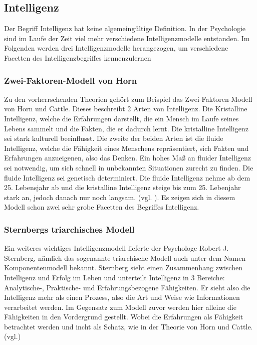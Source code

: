 \documentclass[a4paper, 11pt]{scrartcl}
\begin{document}
\subsection{Intelligenz}
Der Begriff Intelligenz hat keine algemeingültige Definition. In der Psychologie sind im Laufe der Zeit viel mehr verschiedene
Intelligenzmodelle entstanden. Im Folgenden werden drei Intelligenzmodelle herangezogen, um verschiedene Facetten des
 Intelligenzbegriffes kennenzulernen

\subsubsection{Zwei-Faktoren-Modell von Horn}
 Zu den vorherrschenden Theorien gehört zum Beispiel das Zwei-Faktoren-Modell von Horn und Cattle.
Dieses beschreibt 2 Arten von Intelligenz. Die Kristalline Intelligenz, welche die Erfahrungen darstellt, die ein Mensch
im Laufe seines Lebens sammelt und die Fakten, die er dadurch lernt. Die kristalline Intelligenz sei stark kulturell beeinflusst.
Die zweite der beiden Arten ist die fluide Intelligenz, welche
die Fähigkeit eines Menschens repräsentiert, sich Fakten und Erfahrungen anzueigenen, also das Denken. Ein hohes Maß
an fluider Intelligenz sei notwendig, um sich schnell in unbekannten Situationen zurecht zu finden. Die fluide Intelligenz sei genetisch
determiniert. Die fluide Intelligenz nehme ab dem 25. Lebensjahr ab und die kristalline Intelligenz steige bis zum 25. Lebenjahr stark an,
jedoch danach nur noch langsam. (vgl. \cite{Dorsch2019}). Es zeigen sich in diesem Modell schon zwei sehr grobe Facetten
des Begriffes Intelligenz.

\subsubsection{Sternbergs triarchisches Modell}
Ein weiteres wichtiges Intelligenzmodell lieferte
der Psychologe Robert J. Sternberg, nämlich das sogenannte triarchische Modell auch unter dem Namen Komponentenmodell
bekannt. Sternberg sieht einen Zusammenhang zwischen Intelligenz und Erfolg im Leben und unterteilt Intelligenz in 3 Bereiche:
Analytische-, Praktische- und Erfahrungsbezogene Fähigkeiten. Er sieht also die Intelligenz mehr als einen Prozess, also die Art und
Weise wie Informationen verarbeitet werden. Im Gegensatz zum Modell zuvor werden hier alleine die Fähigkeiten in den Vordergrund gestellt.
Wobei die Erfahrungen als Fähigkeit betrachtet werden und incht als Schatz, wie in der Theorie von Horn und Cattle. (vgl.\cite{Stern1984})
\end{document}
